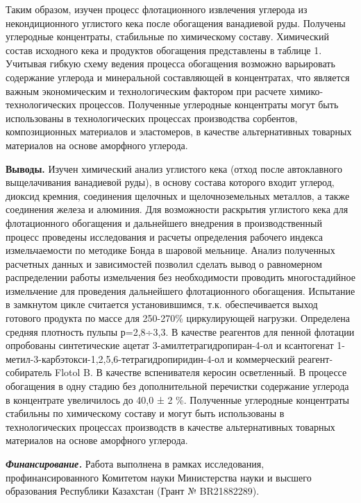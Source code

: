 \begin{multicols}{2}
Таким образом, изучен процесс флотационного извлечения углерода из
некондиционного углистого кека после обогащения ванадиевой руды.
Получены углеродные концентраты, стабильные по химическому составу.
Химический состав исходного кека и продуктов обогащения представлены в
таблице 1. Учитывая гибкую схему ведения процесса обогащения возможно
варьировать содержание углерода и минеральной составляющей в
концентратах, что является важным экономическим и технологическим
фактором при расчете химико-технологических процессов. Полученные
углеродные концентраты могут быть использованы в технологических
процессах производства сорбентов, композиционных материалов и
эластомеров, в качестве альтернативных товарных материалов на основе
аморфного углерода.

{\bfseries Выводы.} Изучен химический анализ углистого кека (отход после
автоклавного выщелачивания ванадиевой руды), в основу состава которого
входит углерод, диоксид кремния, соединения щелочных и щелочноземельных
металлов, а также соединения железа и алюминия. Для возможности
раскрытия углистого кека для флотационного обогащения и дальнейшего
внедрения в производственный процесс проведены исследования и расчеты
определения рабочего индекса измельчаемости по методике Бонда в шаровой
мельнице. Анализ полученных расчетных данных и зависимостей позволил
сделать вывод о равномерном распределении работы измельчения без
необходимости проводить многостадийное измельчение для проведения
дальнейшего флотационного обогащения. Испытание в замкнутом цикле
считается установившимся, т.к. обеспечивается выход готового продукта по
массе для 250-270\% циркулирующей нагрузки. Определена средняя плотность
пульпы р=2,8÷3,3. В качестве реагентов для пенной флотации опробованы
синтетические ацетат 3-амилтетрагидропиран-4-ол и ксантогенат
1-метил-3-карбэтокси-1,2,5,6-тетрагидропиридин-4-ол и коммерческий
реагент-собиратель Flotol B. В качестве вспенивателя керосин
осветленный. В процессе обогащения в одну стадию без дополнительной
перечистки содержание углерода в концентрате увеличилось до 40,0 ± 2 \%.
Полученные углеродные концентраты стабильны по химическому составу и
могут быть использованы в технологических процессах производств в
качестве альтернативных товарных материалов на основе аморфного
углерода.

\emph{{\bfseries Финансирование.}} Работа выполнена в рамках исследования,
профинансированного Комитетом науки Министерства науки и высшего
образования Республики Казахстан (Грант № BR21882289).
\end{multicols}

